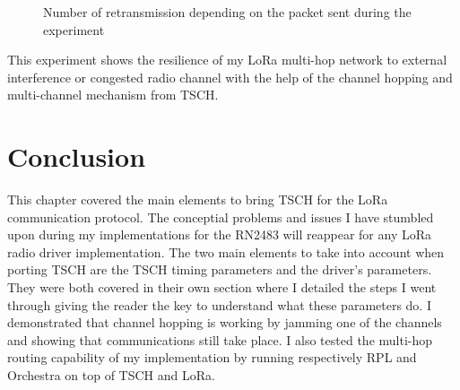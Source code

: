 \begin{figure}[H]
  \centering
  \caption{Number of retransmission depending on the packet sent during the experiment\label{fig:retransmission}}
\end{figure}

This experiment shows the resilience of my LoRa multi-hop network to external
interference or congested radio channel with the help of the channel hopping
and multi-channel mechanism from TSCH.

\section{Conclusion}

This chapter covered the main elements to bring TSCH for the LoRa communication
protocol.
The conceptial problems and issues I have stumbled upon during my implementations for the
RN2483 will reappear for any LoRa radio driver implementation.
The two main elements to take into account when porting TSCH are the TSCH timing
parameters and the driver's parameters.
They were both covered in their own section where I detailed the steps I went
through giving the reader the key to understand what these parameters do.
I demonstrated that channel hopping is working by jamming one of
the channels and showing that communications still take place.
I also tested the multi-hop routing capability of my
implementation by running respectively RPL and Orchestra on top of TSCH and
LoRa.

